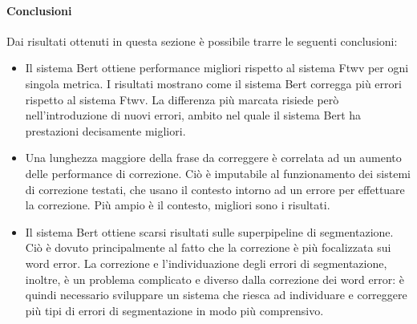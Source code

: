 \paragraph{Conclusioni}
Dai risultati ottenuti in questa sezione è possibile trarre le seguenti conclusioni:
\begin{itemize}
\item Il sistema Bert ottiene performance migliori rispetto al sistema Ftwv per ogni singola metrica. I risultati mostrano come il sistema Bert corregga più errori rispetto al sistema Ftwv. La differenza più marcata risiede però nell'introduzione di nuovi errori, ambito nel quale il sistema Bert ha prestazioni decisamente migliori.

\item Una lunghezza maggiore della frase da correggere è correlata ad un aumento delle performance di correzione. Ciò è imputabile al funzionamento dei sistemi di correzione testati, che usano il contesto intorno ad un errore per effettuare la correzione. Più ampio è il contesto, migliori sono i risultati.

\item Il sistema Bert ottiene scarsi risultati sulle superpipeline di segmentazione. Ciò è dovuto principalmente al fatto che la correzione è più focalizzata sui word error. La correzione e l'individuazione degli errori di segmentazione, inoltre, è un problema complicato e diverso dalla correzione dei word error: è quindi necessario sviluppare un sistema che riesca ad individuare e correggere più tipi di errori di segmentazione in modo più comprensivo.
\end{itemize}

